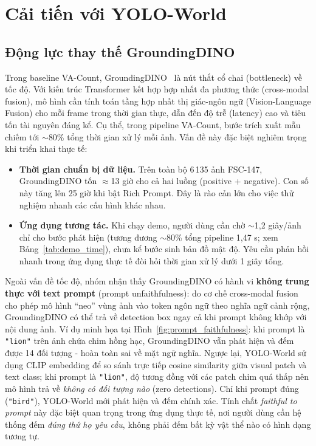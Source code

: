 \documentclass[a4paper,12pt]{report}
\numberwithin{figure}{chapter}
\numberwithin{table}{chapter}
\begin{document}
\section{Cải tiến với YOLO-World}
\label{sec:yolo-world}

\subsection{Động lực thay thế GroundingDINO}

Trong baseline VA-Count, GroundingDINO~\cite{groundingdino} là nút thắt cổ chai (bottleneck) về tốc độ. Với kiến trúc Transformer kết hợp hợp nhất đa phương thức (cross-modal fusion), mô hình cần tính toán tầng hợp nhất thị giác-ngôn ngữ (Vision-Language Fusion) cho mỗi frame trong thời gian thực, dẫn đến độ trễ (latency) cao và tiêu tốn tài nguyên đáng kể. Cụ thể, trong pipeline VA-Count, bước trích xuất mẫu chiếm tới $\sim$80\% tổng thời gian xử lý mỗi ảnh.
Vấn đề này đặc biệt nghiêm trọng khi triển khai thực tế:
\begin{itemize}
    \item \textbf{Thời gian chuẩn bị dữ liệu.} Trên  toàn bộ 6\,135 ảnh FSC-147, GroundingDINO tốn $\approx$13 giờ cho cả hai luồng (positive + negative). Con số này tăng lên 25 giờ khi bật Rich Prompt. Đây là rào cản lớn cho việc thử nghiệm nhanh các cấu hình khác nhau.
    \item \textbf{Ứng dụng tương tác.} Khi chạy demo, người dùng cần chờ $\sim$1,2 giây/ảnh chỉ cho bước phát hiện (tương đương $\sim$80\% tổng pipeline 1,47 s; xem Bảng~\ref{tab:demo_time}), chưa kể bước sinh bản đồ mật độ. Yêu cầu phản hồi nhanh trong ứng dụng thực tế đòi hỏi thời gian xử lý dưới 1 giây tổng.
\end{itemize}
Ngoài vấn đề tốc độ, nhóm nhận thấy GroundingDINO có hành vi \textbf{không trung thực với text prompt} (prompt unfaithfulness): do cơ chế cross-modal fusion cho phép mô hình ``neo'' vùng ảnh vào token ngôn ngữ theo nghĩa ngữ cảnh rộng, GroundingDINO có thể trả về detection box ngay cả khi prompt không khớp với nội dung ảnh. Ví dụ minh họa tại Hình~\ref{fig:prompt_faithfulness}: khi prompt là \texttt{"lion"} trên ảnh chứa chim hồng hạc, GroundingDINO vẫn phát hiện và đếm được 14 đối tượng - hoàn toàn sai về mặt ngữ nghĩa. Ngược lại, YOLO-World sử dụng CLIP embedding để so sánh trực tiếp cosine similarity giữa visual patch và text class; khi prompt là \texttt{"lion"}, độ tương đồng với các patch chim quá thấp nên mô hình trả về \textit{không có đối tượng nào} (zero detections). Chỉ khi prompt đúng (\texttt{"bird"}), YOLO-World mới phát hiện và đếm chính xác. Tính chất \textit{faithful to prompt} này đặc biệt quan trọng trong ứng dụng thực tế, nơi người dùng cần hệ thống đếm \emph{đúng thứ họ yêu cầu}, không phải đếm bất kỳ vật thể nào có hình dạng tương tự.
\end{document}
